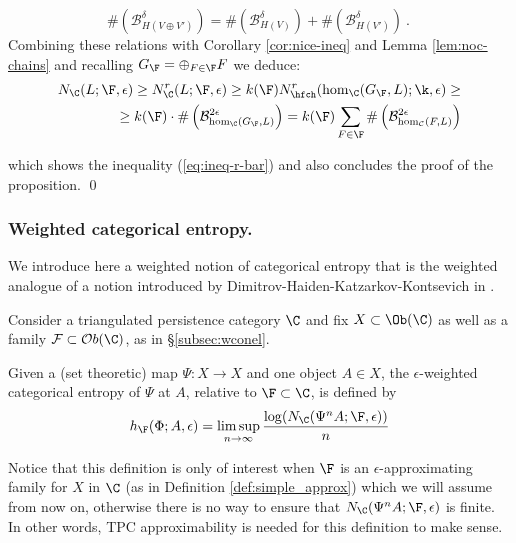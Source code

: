   $$\# \left( \mathcal{B}^{\delta}_{H(V\oplus V')} \right)=\#
  \left(\mathcal{B}^{\delta}_{H(V)}\right) +\# \left(
    \mathcal{B}^{\delta}_{H(V')}\right )~.~$$  Combining these
relations with Corollary \ref{cor:nice-ineq} and Lemma
\ref{lem:noc-chains} and recalling $G_{\F}=\oplus_{F\in\F}F$ we
deduce: 
\begin{eqnarray*}
  N_{\C}(L;\F,\epsilon) \geq  N^{r}_{\C}(L;\F,\epsilon)
  \geq k(\F) N^{r}_{\hfch}(\hom_{\C}(G_{\F}, L); \k,\epsilon) \geq \\ \geq 
  k(\F)\cdot  \#
  \left( \mathcal{B}^{2\epsilon}_{\hom_{\C}(G_{\F},L)}
  \right)=k(\F)\sum_{F\in\F} \#
  \left(\mathcal{B}^{2\epsilon}_{\hom_{\mathcal{C}}(F,L)}\right)
\end{eqnarray*}

which shows the inequality (\ref{eq:ineq-r-bar}) and also
concludes the proof of the proposition. \qed

\subsubsection{Weighted categorical entropy.}\label{subsec:entrop} We introduce here a weighted notion of categorical entropy that is the weighted analogue of a notion introduced by Dimitrov-Haiden-Katzarkov-Kontsevich in \cite{DHKK:dyn_cat}. 

Consider a triangulated persistence category $\C$ and fix $X\subset \Ob (\C)$ as well as a family $\mathcal{F}\subset \mathcal{O}b(\C)$, as in \S\ref{subsec:wconel}.   

\begin{dfn}\label{def:entropy} Given a (set theoretic) map $\Psi:  X\to X$ and one object $A\in X$, the $\epsilon$-weighted categorical entropy of $\Psi$ at $A$, relative to $\F\subset \C$, is defined by
$$h_{\F}(\Phi; A,\epsilon)=\limsup_{n\to \infty} \frac{\log(N_{\C}(\Psi^{n}A;\F,\epsilon))}{n}$$
\end{dfn}
Notice that this definition is only of interest when $\F$ is an $\epsilon$-approximating family for $X$ in $\C$ (as in Definition \ref{def:simple_approx}) which we will assume from now on, otherwise there is no way to ensure that $N_{\C}(\Psi^{n}A;\F, \epsilon)$ is finite. In other words, TPC approximability is needed for this definition to make sense.

